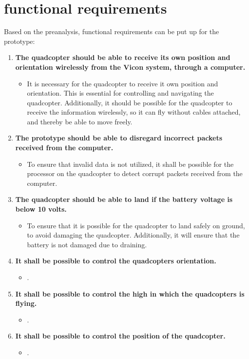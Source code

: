 \chapter{functional requirements}
\label{ch:functionalRequirements}
Based on the preanalysis, functional requirements can be put up for the prototype:

\begin{enumerate}[label=\textbf{\arabic*})]
\item \textbf{The quadcopter should be able to receive its own position and orientation wirelessly from the Vicon system, through a computer.}
\begin{itemize}
\item[] It is necessary for the quadcopter to receive it own position and orientation. This is essential for controlling and navigating the quadcopter. Additionally, it should be possible for the quadcopter to receive the information wirelessly, so it can fly without cables attached, and thereby be able to move freely.
\end{itemize}

\item \textbf{The prototype should be able to disregard incorrect packets received from the computer.}
\begin{itemize}
\item[] To ensure that invalid data is not utilized, it shall be possible for the processor on the quadcopter to detect corrupt packets received from the computer.
\end{itemize}

\item \textbf{The quadcopter should be able to land if the battery voltage is below 10 volts.}
\begin{itemize}
\item[] To ensure that it is possible for the quadcopter to land safely on ground, to avoid damaging the quadcopter. Additionally, it will ensure that the battery is not damaged due to draining.
\end{itemize}

\item \textbf{It shall be possible to control the quadcopters orientation.}
\begin{itemize}
\item[] .
\end{itemize}

\item \textbf{It shall be possible to control the high in which the quadcopters is flying.}
\begin{itemize}
\item[] .
\end{itemize}

\item \textbf{It shall be possible to control the position of the quadcopter.}
\begin{itemize}
\item[] .
\end{itemize}



\end{enumerate}




